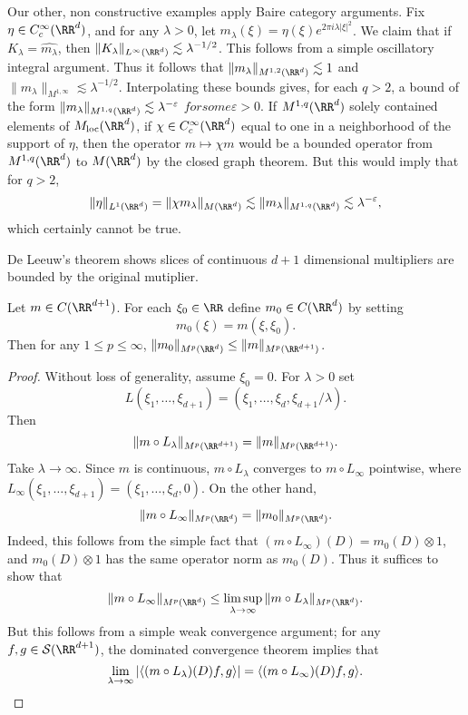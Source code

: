 \begin{example}
    Our other, non constructive examples apply Baire category arguments. Fix $\eta \in C_c^\infty(\RR^d)$, and for any $\lambda > 0$, let $m_\lambda(\xi) = \eta(\xi) e^{2 \pi i \lambda |\xi|^2}$. We claim that if $K_\lambda = \widehat{m_\lambda}$, then $\| K_\lambda \|_{L^\infty(\RR^d)} \lesssim \lambda^{-1/2}$. This follows from a simple oscillatory integral argument. Thus it follows that $\| m_\lambda \|_{M^{1,2}(\RR^d)} \lesssim 1$ and $\| m_\lambda \|_{M^{1,\infty}} \lesssim \lambda^{-1/2}$. Interpolating these bounds gives, for each $q > 2$, a bound of the form $\| m_\lambda \|_{M^{1,q}(\RR^d)} \lesssim \lambda^{-\varepsilon}$ $for some $$\varepsilon > 0$. If $M^{1,q}(\RR^d)$ solely contained elements of $M_{\text{loc}}(\RR^d)$, if $\chi \in C_c^\infty(\RR^d)$ equal to one in a neighborhood of the support of $\eta$, then the operator $m \mapsto \chi m$ would be a bounded operator from $M^{1,q}(\RR^d)$ to $M(\RR^d)$ by the closed graph theorem. But this would imply that for $q > 2$,
    \[ \| \eta \|_{L^1(\RR^d)} = \| \chi m_\lambda \|_{M(\RR^d)} \lesssim \| m_\lambda \|_{M^{1,q}(\RR^d)} \lesssim \lambda^{-\varepsilon}, \]
    which certainly cannot be true.
\end{example}

De Leeuw's theorem shows slices of continuous $d+1$ dimensional multipliers are bounded by the original mutiplier.

\begin{theorem}
  Let $m \in C(\RR^{d+1})$. For each $\xi_0 \in \RR$ define $m_0 \in C(\RR^d)$ by setting
  \[ m_0(\xi) = m(\xi,\xi_0). \]
  Then for any $1 \leq p \leq \infty$, $\| m_0 \|_{M^p(\RR^d)} \leq \| m \|_{M^p(\RR^{d+1})}$.
\end{theorem}
\begin{proof}
  Without loss of generality, assume $\xi_0 = 0$. For $\lambda > 0$ set
  \[ L(\xi_1,\dots,\xi_{d+1}) = (\xi_1,\dots,\xi_d,\xi_{d+1}/\lambda). \]
  Then
  \[ \| m \circ L_\lambda \|_{M^p(\RR^{d+1})} = \| m \|_{M^p(\RR^{d+1})}. \]
  Take $\lambda \to \infty$. Since $m$ is continuous, $m \circ L_\lambda$ converges to $m \circ L_\infty$ pointwise, where $L_\infty(\xi_1,\dots,\xi_{d+1}) = (\xi_1,\dots,\xi_d,0)$. On the other hand,
  \[ \| m \circ L_\infty \|_{M^p(\RR^d)} = \| m_0 \|_{M^p(\RR^d)}. \]
  Indeed, this follows from the simple fact that $(m \circ L_\infty)(D) = m_0(D) \otimes 1$, and $m_0(D) \otimes 1$ has the same operator norm as $m_0(D)$. Thus it suffices to show that
  \[ \| m \circ L_\infty \|_{M^p(\RR^d)} \leq \limsup_{\lambda \to \infty} \| m \circ L_\lambda \|_{M^p(\RR^d)}. \]
  But this follows from a simple weak convergence argument; for any $f,g \in \mathcal{S}(\RR^{d+1})$, the dominated convergence theorem implies that
  \[ \lim_{\lambda \to \infty} |\langle (m \circ L_\lambda)(D) f, g \rangle| = \langle (m \circ L_\infty)(D) f, g \rangle. \qedhere \]
\end{proof}

